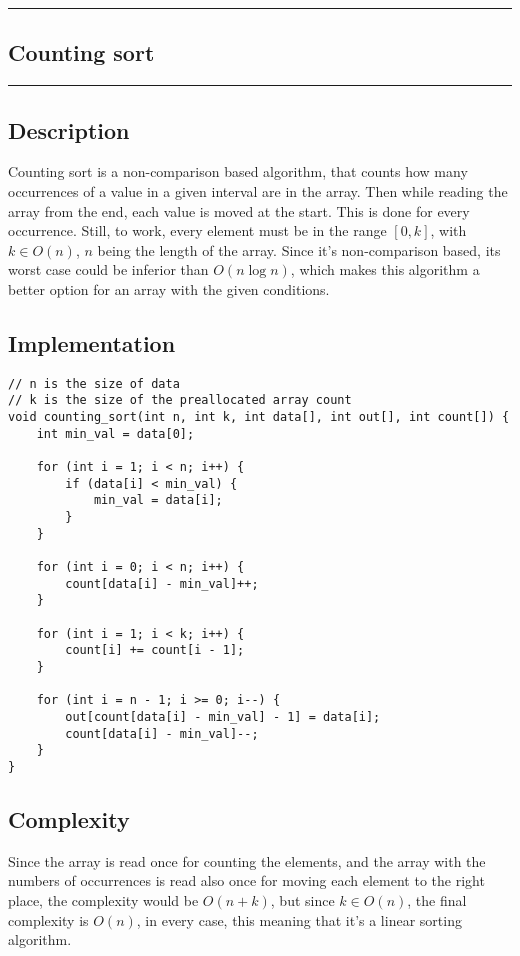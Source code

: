 {\color{gray}\hrule}
\begin{center}
\section{Counting sort}
\bigskip
\end{center}
{\color{gray}\hrule}
\begin{multicols}{2}

\subsection{Description}
Counting sort is a non-comparison based algorithm, that counts how many occurrences of a value in a given interval are in the array. Then while reading the array from the end, each value is moved at the start. This is done for every occurrence. Still, to work, every element must be in the range $[ 0, k ]$, with $k \in O(n)$, $n$ being the length of the array.
Since it's non-comparison based, its worst case could be inferior than $O(n \log n)$, which makes this algorithm a better option for an array with the given conditions. 

\subsection{Implementation}

\begin{verbatim}
// n is the size of data
// k is the size of the preallocated array count
void counting_sort(int n, int k, int data[], int out[], int count[]) {
    int min_val = data[0];

    for (int i = 1; i < n; i++) {
        if (data[i] < min_val) {
            min_val = data[i];
        }
    }

    for (int i = 0; i < n; i++) {
        count[data[i] - min_val]++;
    }

    for (int i = 1; i < k; i++) {
        count[i] += count[i - 1];
    }

    for (int i = n - 1; i >= 0; i--) {
        out[count[data[i] - min_val] - 1] = data[i];
        count[data[i] - min_val]--;
    }
}
\end{verbatim}

\subsection{Complexity}
Since the array is read once for counting the elements, and the array with the numbers of occurrences is read also once for moving each element to the right place, the complexity would be $O(n+k)$, but since $k \in O(n)$, the final complexity is $O(n)$, in every case, this meaning that it's a linear sorting algorithm.


\end{multicols}